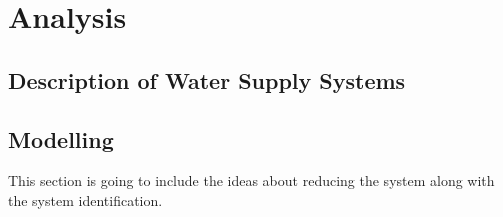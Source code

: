 
\part{Analysis}
\label{Analysis}

\chapter{Description of Water Supply Systems}
\label{description_of_water_supply_systems}

 





\chapter{Modelling}
\label{modelling}

This section is going to include the ideas about reducing the system along with the system identification. 





























